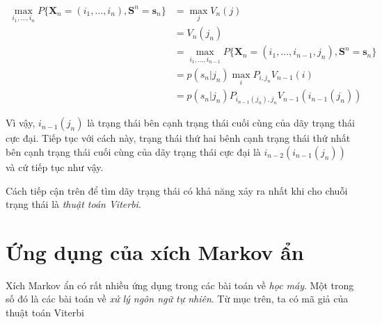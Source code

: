 \documentclass[14pt, a4paper]{article}
\numberwithin{equation}{section}
\numberwithin{figure}{section}
\theoremstyle{sltheorem}
\theoremstyle{soltheorem}
\numberwithin{dl}{section}
\numberwithin{md}{section}
\numberwithin{vd}{section}
\begin{document}
    \begin{equation*}
        \begin{aligned}
            \max_{i_1, \dots, i_n} P \lbrace \mathbf{X}_n = (i_1, \dots, i_n), \mathbf{S}^n = \mathbf{s}_n \rbrace &= \max_j V_n(j) \\
            &= V_n (j_n) \\
            &= \max_{i_1, \dots, i_{n-1}} P \lbrace \mathbf{X}_n = (i_1, \dots, i_{n-1}, j_n), \mathbf{S}^n = \mathbf{s}_n \rbrace \\
            &= p(s_n \vert j_n) \max_i P_{i, j_n} V_{n-1}(i) \\
            &= p(s_n \vert j_n) P_{i_{n-1}(j_n), j_n} V_{n-1} (i_{n-1}(j_n))
        \end{aligned}
    \end{equation*}

    Vì vậy, $i_{n-1}(j_n)$ là trạng thái bên cạnh trạng thái cuối cùng của dãy trạng thái cực đại.
    Tiếp tục với cách này, trạng thái thứ hai bênh cạnh trạng thái thứ nhất bên cạnh trạng thái cuối cùng của dãy trạng thái cực đại là $i_{n-2}(i_{n-1}(j_n))$ và cứ tiếp tục như vậy.

    Cách tiếp cận trên để tìm dãy trạng thái có khả năng xảy ra nhất khi cho chuỗi trạng thái là \textit{thuật toán Viterbi}.

    \section{Ứng dụng của xích Markov ẩn}

    Xích Markov ẩn có rất nhiều ứng dụng trong các bài toán về \textit{học máy}.
    Một trong số đó là các bài toán về \textit{xử lý ngôn ngữ tự nhiên}.
    Từ mục trên, ta có mã giả của thuật toán Viterbi
\end{document}
